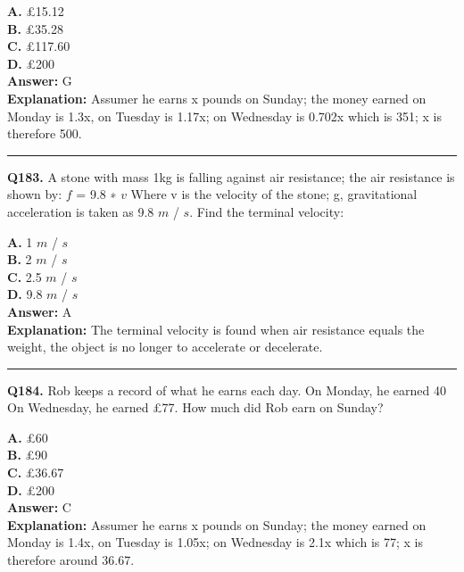 \documentclass[12pt]{article}
\begin{document}
\textbf{A.} £15.12 \\
\textbf{B.} £35.28 \\
\textbf{C.} £117.60 \\
\textbf{D.} £200 \\

\textbf{Answer:} G \\
\textbf{Explanation:} Assumer he earns x pounds on Sunday; the money earned on Monday is 1.3x, on Tuesday is 1.17x; on Wednesday is 0.702x which is 351; x is therefore 500.

\hrule
\vspace{1em}


\noindent
\textbf{Q183.} A stone with mass 1kg is falling against air resistance; the air resistance is shown by:
$𝑓$
= 9.8
∗
$𝑣$
Where v is the velocity of the stone; g, gravitational acceleration is taken as 9.8
$𝑚$
/
$𝑠$.
Find the terminal velocity:



\textbf{A.} 1
$𝑚$
/
$𝑠$ \\
\textbf{B.} 2
$𝑚$
/
$𝑠$ \\
\textbf{C.} 2.5
$𝑚$
/
$𝑠$ \\
\textbf{D.} 9.8
$𝑚$
/
$𝑠$ \\

\textbf{Answer:} A \\
\textbf{Explanation:} The terminal velocity is found when air resistance equals the weight, the object is no
longer to accelerate or decelerate.

\hrule
\vspace{1em}


\noindent
\textbf{Q184.} Rob keeps a record of what he earns each day.
On Monday, he earned 40%
On Wednesday, he earned £77. How much did Rob earn on Sunday?



\textbf{A.} £60 \\
\textbf{B.} £90 \\
\textbf{C.} £36.67 \\
\textbf{D.} £200 \\

\textbf{Answer:} C \\
\textbf{Explanation:} Assumer he earns x pounds on Sunday; the money earned on Monday is 1.4x, on Tuesday is 1.05x; on Wednesday is 2.1x which is 77; x is therefore around 36.67.
\end{document}
